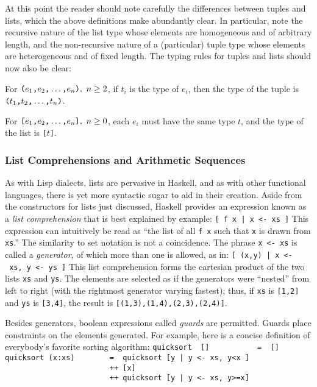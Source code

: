 At this point the reader should note carefully the differences between
tuples and lists, which the above definitions make abundantly clear.
In particular, note the recursive nature of the list type whose
elements are homogeneous and of arbitrary length, and the
non-recursive nature of a (particular) tuple type whose elements are
heterogeneous and of fixed length.  The typing rules for tuples and
lists should now also be clear:

For $\mbox{\tt (}e_1\mbox{\tt ,}e_2\mbox{\tt ,}\ldots\mbox{\tt ,}e_n\mbox{\tt )},\ n\geq2$, if $t_i$ is the
type of $e_i$, then the type of the tuple is 
$\mbox{\tt (}t_1\mbox{\tt ,}t_2\mbox{\tt ,}\ldots\mbox{\tt ,}t_n\mbox{\tt )}$.

For $\mbox{\tt [}e_1\mbox{\tt ,}e_2\mbox{\tt ,}\ldots\mbox{\tt ,}e_n\mbox{\tt ]},\ n\geq0$, each $e_i$ must have
the same type $t$, and the type of the list is \mbox{\tt [}$t$\mbox{\tt ]}.

\subsubsection{List Comprehensions and Arithmetic Sequences}
\label{tut-list-comps}

As with Lisp dialects, lists are pervasive in Haskell, and as with
other functional languages, there is yet more syntactic sugar to aid
in their creation.  Aside from the constructors for lists just
discussed, Haskell provides an expression known as a {\em list
comprehension} that is best explained by example:
\bprog
\mbox{\tt [\ f\ x\ |\ x\ <-\ xs\ ]}
\eprog 
This expression can intuitively be read as ``the list of all \mbox{\tt f\ x} 
such that \mbox{\tt x} is drawn from \mbox{\tt xs}.''  The similarity to set notation is
not a coincidence.  The phrase \mbox{\tt x\ <-\ xs} is called a {\em generator},
of which more than one is allowed, as in:
\bprog
\mbox{\tt [\ (x,y)\ |\ x\ <-\ xs,\ y\ <-\ ys\ ]}
\eprog 
This list comprehension forms the cartesian product of the two lists
\mbox{\tt xs} and \mbox{\tt ys}.  The elements are selected as if the generators were
``nested'' from left to right (with the rightmost generator varying
fastest); thus, if \mbox{\tt xs} is \mbox{\tt [1,2]} and \mbox{\tt ys} is \mbox{\tt [3,4]}, the result is
\mbox{\tt [(1,3),(1,4),(2,3),(2,4)]}.

Besides generators, boolean expressions called {\em guards} are
permitted.  Guards place constraints on the elements generated.  For
example, here is a concise definition of everybody's favorite sorting
algorithm:
\bprog
\mbox{\tt quicksort\ \ []\ \ \ \ \ \ \ \ \ \ \ =\ \ []}\\
\mbox{\tt quicksort\ (x:xs)\ \ \ \ \ \ \ \ =\ \ quicksort\ [y\ |\ y\ <-\ xs,\ y<x\ ]}\\
\mbox{\tt \ \ \ \ \ \ \ \ \ \ \ \ \ \ \ \ \ \ \ \ \ \ \ \ ++\ [x]}\\
\mbox{\tt \ \ \ \ \ \ \ \ \ \ \ \ \ \ \ \ \ \ \ \ \ \ \ \ ++\ quicksort\ [y\ |\ y\ <-\ xs,\ y>=x]}
\eprog

